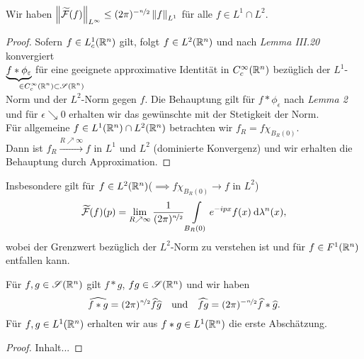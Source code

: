 \documentclass[skript.tex]{subfiles}
\begin{document}
	\begin{lem}
		Wir haben $\left\lVert \widetilde{\mathcal{F}}(f) \right\rVert_{L^\infty} \leq (2\pi)^{-\nicefrac{n}{2}} \left\lVert f \right\rVert_{L^1}$ für alle $f \in L^1 \cap L^2$.
	\end{lem}
	\begin{proof}
		Sofern $f \in L_c^1(\mathbb{R}^n)$ gilt, folgt $f \in L^2(\mathbb{R}^n)$ und nach \emph{Lemma III.20} konvergiert\\ $\underbrace{f \ast \phi_\epsilon}_{\mathrlap{\in C_c^\infty(\R^n)\sbs\ms{S}(\R^n)}}$ für eine geeignete approximative Identität in $C_c^\infty(\mathbb{R}^n)$ bezüglich der $L^1$-Norm und der $L^2$-Norm gegen $f$. Die Behauptung gilt für $f \ast \phi_\epsilon$ nach \emph{Lemma 2} und für $\epsilon \searrow 0$ erhalten wir das gewünschte mit der Stetigkeit der Norm.\\
		Für allgemeine $f \in L^1(\mathbb{R}^n) \cap L^2(\mathbb{R}^n)$ betrachten wir $f_R=f\chi_{B_R(0)}$.\\ %
		Dann ist $f_R\xrightarrow{R\nearrow\infty}f$ in $L^1$ und $L^2$ (dominierte Konvergenz) und wir erhalten die Behauptung durch Approximation.
	\end{proof}
	Insbesondere gilt für $f \in L^2(\mathbb{R}^n)$\quad($\implies  f\chi_{B_R(0)} \to f$ in $L^2$)
	\[
		\widetilde{\mathcal{F}}(f)(p) = \lim_{R\nearrow\infty} \frac{1}{(2\pi)^{\nicefrac{n}{2}}} \int\limits_{B_R(0)} e^{-ipx} f(x) \: \mathrm{d}\lambda^n(x),
	\]
	wobei der Grenzwert bezüglich der $L^2$-Norm zu verstehen ist und für $f \in F^1(\mathbb{R}^n)$ entfallen kann.
	\begin{lem}
		Für $f,g\in\mathscr{S}(\mathbb{R}^n)$ gilt $f \ast g$, $fg\in\mathscr{S}(\mathbb{R}^n)$ und wir haben
		\[
			\widehat{f \ast g} = (2\pi)^{\nicefrac{n}{2}} \widehat{f}\widehat{g} \quad\text{und}\quad \widehat{fg}=(2\pi)^{-\nicefrac{n}{2}}\widehat{f}\ast\widehat{g}.
		\]
		Für $f,g \in L^1(\mathbb{R}^n)$ erhalten wir aus $f \ast g \in L^1(\mathbb{R}^n)$ die erste Abschätzung.
	\end{lem}
	\begin{proof}
		Inhalt...
	\end{proof}
\end{document}
